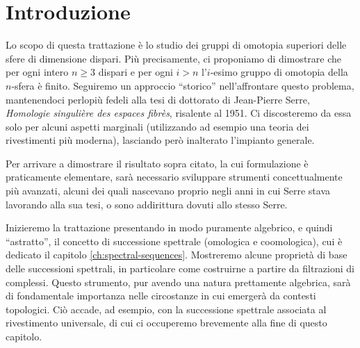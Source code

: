 \chapter*{Introduzione}
Lo scopo di questa trattazione è lo studio dei gruppi di omotopia superiori delle sfere di dimensione dispari. Più precisamente, ci proponiamo di dimostrare che per ogni intero $n\ge 3$ dispari e per ogni $i>n$ l'$i$-esimo gruppo di omotopia della $n$-sfera è finito. Seguiremo un approccio \enquote{storico} nell'affrontare questo problema, mantenendoci perlopiù fedeli alla tesi di dottorato di Jean-Pierre Serre, \emph{Homologie singulière des espaces fibrès}, risalente al 1951. Ci discosteremo da essa solo per alcuni aspetti marginali (utilizzando ad esempio una teoria dei rivestimenti più moderna), lasciando però inalterato l'impianto generale.

Per arrivare a dimostrare il risultato sopra citato, la cui formulazione è praticamente elementare, sarà necessario sviluppare strumenti concettualmente più avanzati, alcuni dei quali nascevano proprio negli anni in cui Serre stava lavorando alla sua tesi, o sono addirittura dovuti allo stesso Serre.

Inizieremo la trattazione presentando in modo puramente algebrico, e quindi \enquote{astratto}, il concetto di successione spettrale (omologica e coomologica), cui è dedicato il capitolo \ref{ch:spectral-sequences}. Mostreremo alcune proprietà di base delle successioni spettrali, in particolare come costruirne a partire da filtrazioni di complessi. Questo strumento, pur avendo una natura prettamente algebrica, sarà di fondamentale importanza nelle circostanze in cui emergerà da contesti topologici. Ciò accade, ad esempio, con la successione spettrale associata al rivestimento universale, di cui ci occuperemo brevemente alla fine di questo capitolo.

